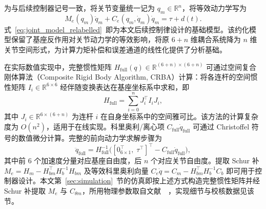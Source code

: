 为与后续控制器记号一致，将关节变量统一记为 \(q_m\in\mathbb R^n\)，将等效动力学写为
\begin{equation}
M_e(q_m)\ddot q_m + C_e(q_m,\dot q_m)\dot q_m = \tau + d(t).
\label{eq:joint_model_relabelled}
\end{equation}
式~\eqref{eq:joint_model_relabelled}~即为本文后续控制律设计的基础模型。该约化模型保留了基座反作用对关节动力学的等效影响，将原 \(6+n\) 维耦合系统降为 \(n\) 维关节空间形式，为计算力矩补偿和误差通道的线性化提供了分析基础。

\begin{remark}
  在实际数值实现中，完整惯性矩阵 \(H_{\text{full}}(q)\in\mathbb R^{(6+n)\times(6+n)}\) 可通过空间复合刚体算法（Composite Rigid Body Algorithm, CRBA）计算：将各连杆的空间惯性矩阵 \(I_i\in\mathbb R^{6\times6}\) 经伴随变换表达在基座坐标系中求和，即
  \[
  H_{\text{full}} = \sum_{i=0}^{n} J_i^\top I_i J_i,
  \]
  其中 \(J_i\in\mathbb R^{6\times(6+n)}\) 为连杆 \(i\) 在自身坐标系中的空间雅可比。该方法的计算复杂度为 \(O(n^2)\)，适用于在线实现。科里奥利/离心项 \(C_{\text{full}}\dot q_{\text{full}}\) 可通过 Christoffel 符号的数值微分计算。完整的前向动力学求解步骤为
  \[
  \ddot q_{\text{full}} = H_{\text{full}}^{-1}\bigl([0_{6\times1}^\top,\;\tau^\top]^\top - C_{\text{full}}\dot q_{\text{full}}\bigr),
  \]
  其中前 \(6\) 个加速度分量对应基座自由度，后 \(n\) 个对应关节自由度。提取 Schur 补 \(M_e = H_m - H_{bm}^\top H_b^{-1} H_{bm}\) 及等效科里奥利向量 \(C_e\dot q = C_m - H_{bm}^\top H_b^{-1} C_b\) 即可用于控制器设计。本文第~\ref{sec:simulation}~节的仿真即按上述方式构造完整惯性矩阵并经 Schur 补提取 \(M_e\) 与 \(C_{\theta m}\)，所用物理参数取自文献~\cite{dou2025fractional}~，实现细节与校核数据见该节。
\end{remark}